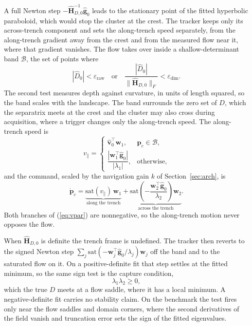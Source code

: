\documentclass[lettersize,journal]{IEEEtran}
\begin{document}
A full Newton step $-\hat{\mathbf{H}}_{D,0}^{-1}\hat{\mathbf{g}}_0$ leads
to the stationary point of the fitted hyperbolic paraboloid, which would
stop the cluster at the crest. The tracker keeps only its across-trench
component and sets the along-trench speed separately, from the
along-trench gradient away from the crest and from the measured flow near
it, where that gradient vanishes. The flow takes over inside a
shallow-determinant band $\mathcal{B}$, the set of points where
\begin{equation}
    |\hat{D}_0| < \varepsilon_{\mathrm{raw}}
    \quad\text{or}\quad
    \frac{|\hat{D}_0|}{\|\hat{\mathbf{H}}_{D,0}\|_F}
        < \varepsilon_{\dim}.
    \label{eq:band}
\end{equation}
The second test measures depth against curvature, in units of length
squared, so the band scales with the landscape. The band surrounds the
zero set of $D$, which the separatrix meets at the crest and the cluster
may also cross during acquisition, where a trigger changes only the
along-trench speed. The along-trench speed is
\begin{equation}
    v_\parallel =
    \begin{cases}
        \hat{\mathbf{v}}_0^\top \mathbf{w}_1,
            & \mathbf{p}_c \in \mathcal{B}, \\[6pt]
        \dfrac{|\mathbf{w}_1^\top \hat{\mathbf{g}}_0|}{|\lambda_1|},
            & \text{otherwise},
    \end{cases}
    \label{eq:vpar}
\end{equation}
and the command, scaled by the navigation gain $k$ of
Section~\ref{sec:arch}, is
\begin{equation}
    \dot{\mathbf{p}}_c =
    \underbrace{\mathrm{sat}(v_\parallel)\,\mathbf{w}_1}_{\text{along the trench}}
    + \underbrace{\mathrm{sat}\!\left(-\frac{\mathbf{w}_2^\top
      \hat{\mathbf{g}}_0}{\lambda_2}\right)\mathbf{w}_2}_{\text{across the trench}}.
    \label{eq:d_law}
\end{equation}
Both branches of (\ref{eq:vpar}) are nonnegative, so the along-trench
motion never opposes the flow.

When $\hat{\mathbf{H}}_{D,0}$ is definite the trench frame is undefined.
The tracker then reverts to the signed Newton step
$\sum_j \mathrm{sat}(-\mathbf{w}_j^\top\hat{\mathbf{g}}_0/
\lambda_j)\mathbf{w}_j$ off the band and to the saturated flow on it.
On a positive-definite fit that step settles at the fitted minimum, so
the same sign test is the capture condition,
\begin{equation}
    \lambda_1 \lambda_2 \geq 0,
    \label{eq:d_capture}
\end{equation}
which the true $D$ meets at a flow saddle, where it has a local minimum.
A negative-definite fit carries no stability claim. On the benchmark the
test fires only near the flow saddles and domain corners, where the
second derivatives of the field vanish and truncation error sets the
sign of the fitted eigenvalues.
\end{document}
